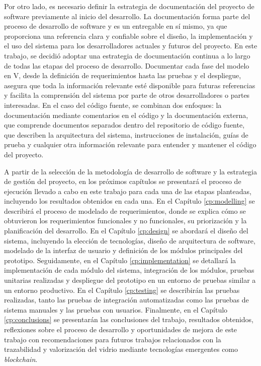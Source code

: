 Por otro lado, es necesario definir la estrategia de documentación del proyecto de software previamente al inicio del desarrollo. La documentación forma parte del proceso de desarrollo de software y es un entregable en sí mismo, ya que proporciona una referencia clara y confiable sobre el diseño, la implementación y el uso del sistema para los desarrolladores actuales y futuros del proyecto. En este trabajo, se decidió adoptar una estrategia de documentación continua a lo largo de todas las etapas del proceso de desarrollo. Documentar cada fase del modelo en V, desde la definición de requerimientos hasta las pruebas y el despliegue, asegura que toda la información relevante esté disponible para futuras referencias y facilita la comprensión del sistema por parte de otros desarrolladores o partes interesadas. En el caso del código fuente, se combinan dos enfoques: la documentación mediante comentarios en el código y la documentación externa, que comprende documentos separados dentro del repositorio de código fuente, que describen la arquitectura del sistema, instrucciones de instalación, guías de prueba y cualquier otra información relevante para entender y mantener el código del proyecto.

A partir de la selección de la metodología de desarrollo de software y la estrategia de gestión del proyecto, en los próximos capítulos se presentará el proceso de ejecución llevado a cabo en este trabajo para cada una de las etapas planteadas, incluyendo los resultados obtenidos en cada una.
En el Capítulo \ref{cp:modelling} se describirá el proceso de modelado de requerimientos, donde se explica cómo se obtuvieron los requerimientos funcionales y no funcionales, su priorización y la planificación del desarrollo.
En el Capítulo \ref{cp:design} se abordará el diseño del sistema, incluyendo la elección de tecnologías, diseño de arquitectura de software, modelado de la interfaz de usuario y definición de los módulos principales del prototipo.
Seguidamente, en el Capítulo \ref{cp:implementation} se detallará la implementación de cada módulo del sistema, integración de los módulos, pruebas unitarias realizadas y despliegue del prototipo en un entorno de pruebas similar a un entorno productivo.
En el Capítulo \ref{cp:testing} se describirán las pruebas realizadas, tanto las pruebas de integración automatizadas como las pruebas de sistema manuales y las pruebas con usuarios.
Finalmente, en el Capítulo \ref{cp:conclusions} se presentarán las conclusiones del trabajo, resultados obtenidos, reflexiones sobre el proceso de desarrollo y oportunidades de mejora de este trabajo con recomendaciones para futuros trabajos relacionados con la trazabilidad y valorización del vidrio mediante tecnologías emergentes como \textit{blockchain}.

